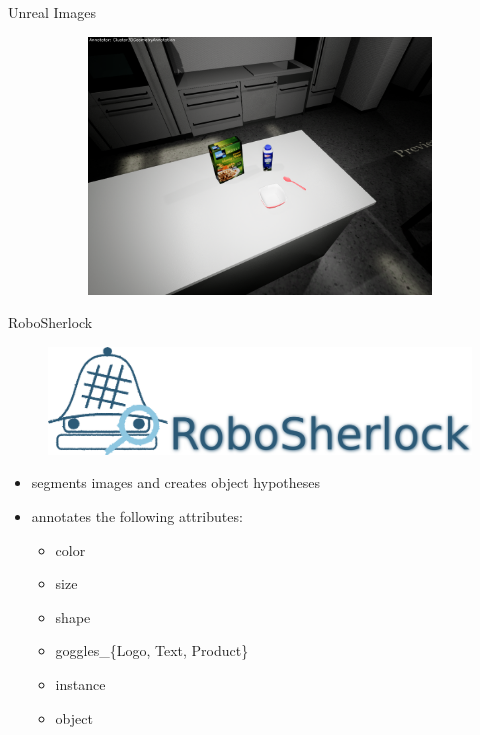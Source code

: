 \documentclass[]{beamer}
\begin{document}
\begin{frame}{Unreal Images}
\begin{figure}
\begin{subfigure}[b]{0.3\textwidth}
		\includegraphics[scale=.08]{../thesis/img/chapter3/sceneEx_5}	
	\end{subfigure}
\end{figure}
\end{frame}


\begin{frame}{RoboSherlock}
	\begin{figure}
		\includegraphics[scale=.3]{img/rs_logo_text.png}
	\end{figure}
	\begin{itemize}
		\item segments images and creates object hypotheses
		\item annotates the following attributes: 
		\begin{itemize}
			\item color
			\item size
			\item shape
			\item goggles\_\{Logo, Text, Product\}
			\item instance
			\item object
		\end{itemize}
	\end{itemize}
\end{frame}
\end{document}
